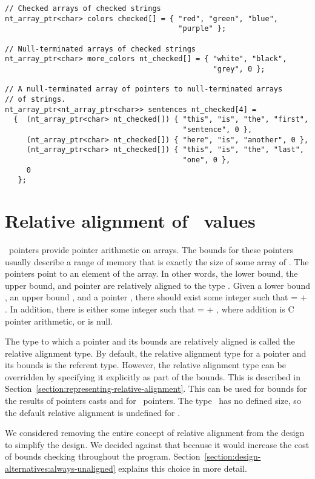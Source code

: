 \begin{lstlisting}
// Checked arrays of checked strings
nt_array_ptr<char> colors checked[] = { "red", "green", "blue",
                                        "purple" };

// Null-terminated arrays of checked strings
nt_array_ptr<char> more_colors nt_checked[] = { "white", "black",
                                                "grey", 0 };

// A null-terminated array of pointers to null-terminated arrays
// of strings.
nt_array_ptr<nt_array_ptr<char>> sentences nt_checked[4] =
  {  (nt_array_ptr<char> nt_checked[]) { "this", "is", "the", "first",
                                         "sentence", 0 },
     (nt_array_ptr<char> nt_checked[]) { "here", "is", "another", 0 },
     (nt_array_ptr<char> nt_checked[]) { "this", "is", "the", "last",
                                         "one", 0 },
     0
   };
\end{lstlisting}

\section{Relative alignment of \arrayptr\ values}
\label{section:relative-alignment}

\arrayptrT\ pointers provide
pointer arithmetic on arrays. The bounds for these pointers usually
describe a range of memory that is exactly the size of some array of .
The pointers point to an element of the array. In other words, the lower
bound, the upper bound, and pointer are  relatively aligned to the type
. Given a lower bound , an upper bound , and a
pointer , there should exist some integer  such that
 =  + . In addition, there is either some
integer  such that  =  + ,
where addition is C pointer arithmetic, or  is null.

The type to which a pointer and its bounds are relatively aligned is
called the relative alignment type. By default, the relative alignment
type for a pointer and its bounds is the referent type. However, the
relative alignment type can be overridden by specifying it explicitly as
part of the bounds.  This is described in
Section~\ref{section:representing-relative-alignment}.
This can be used for bounds for the results of pointers casts and
for  \arrayptrvoid\ pointers. The type
\void\ has no defined size, so the default relative alignment is
undefined for \void.

We considered removing the entire concept of relative alignment from the
design to simplify the design.  We decided against that because it would
increase the cost of bounds checking throughout the program.
Section~\ref{section:design-alternatives:always-unaligned} explains
this choice in more detail.

